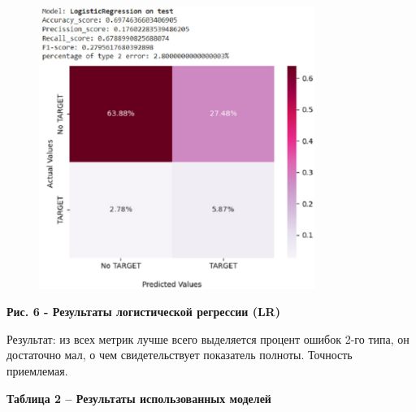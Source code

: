 \begin{figure}[H]
	\centering
	\includegraphics[width=0.8\textwidth]{assets/124}
	\caption*{}
\end{figure}

{\bfseries Рис. 6 - Результаты логистической регрессии (LR)}

Результат: из всех метрик лучше всего выделяется процент ошибок 2-го
типа, он достаточно мал, о чем свидетельствует показатель полноты.
Точность приемлемая.

{\bfseries Таблица 2 -- Результаты использованных моделей}

